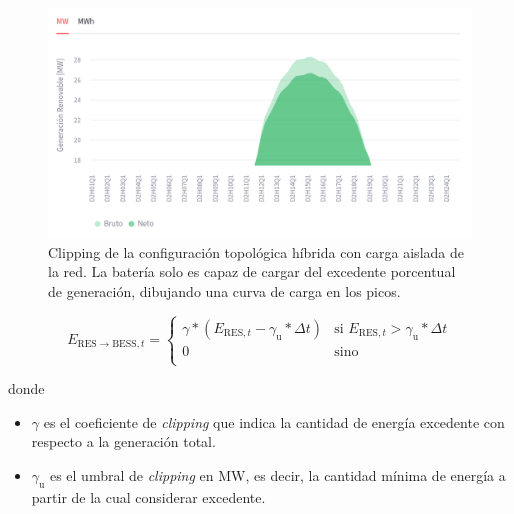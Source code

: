 \begin{figure}
  \centering
  \includegraphics[width=0.75\linewidth]{figures/clipping.png}
  \caption[Clipping de configuración topológica híbrida.]{Clipping de la configuración topológica híbrida con carga aislada de la red. La batería solo es capaz de cargar del excedente porcentual de generación, dibujando una curva de carga en los picos.}%
  \label{fig:clipping}
\end{figure}

\begin{samepage}

  \begin{equation}%
    \label{eq:clipping}
    E_{\mathrm{RES} \rightarrow \mathrm{BESS}, t} =
    \begin{cases}
      \gamma * (E_{\mathrm{RES}, t} - \gamma_{\mathrm{u}} * \Delta t) & \text{si } E_{\mathrm{RES}, t} > \gamma_{\mathrm{u}} * \Delta t \\
      0                                                             & \text{sino}                                                   \\
    \end{cases}
  \end{equation}

  donde

  \begin{itemize}

    \item \( \gamma \) es el coeficiente de \textit{clipping} que indica la cantidad de energía excedente con respecto a la generación total.

    \item \( \gamma_{\mathrm{u}} \) es el umbral de \textit{clipping} en \si{\mega\watt}, es decir, la cantidad mínima de energía a partir de la cual considerar excedente.

  \end{itemize}

\end{samepage}

